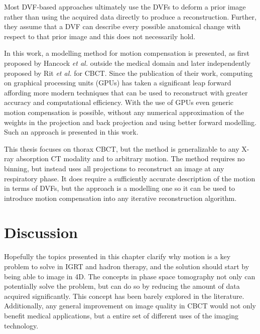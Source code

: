 Most DVF-based approaches ultimately use the DVFs to deform a prior image rather than using the acquired data directly to produce a reconstruction.  Further, they assume that a DVF can describe every possible anatomical change with respect to that prior image and this does not necessarily hold.

In this work, a modelling method for motion compensation is presented, as first proposed by Hancock \textit{et al.}\cite{pst1} outside the medical domain and later independently proposed by Rit \textit{et al.}\cite{Rit1}\cite{Rit2} for CBCT. Since the publication of their work, computing on graphical processing units (GPUs) has taken a significant leap forward affording more modern techniques that can be used to reconstruct with greater accuracy and computational efficiency. With the use of GPUs even generic motion compensation is possible, without any numerical approximation of the weights in the projection and back projection and using better forward modelling\cite{fwdproj}. Such an approach is presented in this work.

This thesis focuses on thorax CBCT, but the method is generalizable to any X-ray absorption CT modality and to arbitrary motion.  The method requires no binning, but instead uses all projections to reconstruct an image at any respiratory phase.  It does require a sufficiently accurate description of the motion in terms of DVFs, but the approach is a modelling one so it can be used to introduce motion compensation into any iterative reconstruction algorithm. 

\section{Discussion}

Hopefully the topics presented in this chapter clarify why motion is a key problem to solve in IGRT and hadron therapy, and the solution should start by being able to image in 4D. The concepts in phase space tomography not only can potentially solve the problem, but can do so by reducing the amount of data acquired significantly. This concept has been barely explored in the literature. Additionally, any general improvement on image quality in CBCT would not only benefit medical applications, but a entire set of different uses of the imaging technology.